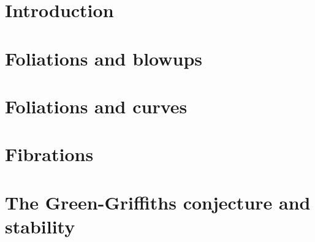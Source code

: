 
\section{Introduction}



\section{Foliations and blowups}



\section{Foliations and curves}



\section{Fibrations}



\section{The Green-Griffiths conjecture and stability}


